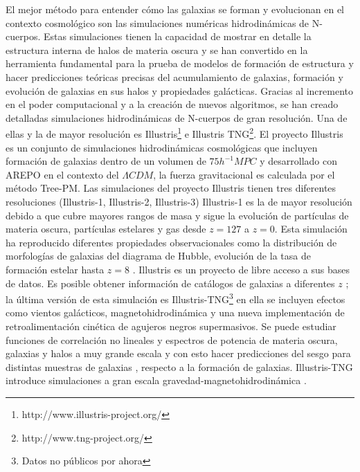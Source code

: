 \documentclass[12pt]{article}
\begin{document}
El mejor método para entender cómo las galaxias se forman y evolucionan en el 
contexto cosmológico son las simulaciones numéricas hidrodinámicas de 
N-cuerpos. Estas simulaciones tienen la capacidad de mostrar en detalle la 
estructura interna de halos de materia oscura  y se han convertido en la 
herramienta fundamental para la prueba de modelos de formación de estructura y 
hacer predicciones teóricas precisas del acumulamiento de galaxias, formación y 
evolución de galaxias en sus halos y propiedades galácticas. Gracias al 
incremento en el poder computacional y a la creación de nuevos algoritmos, se 
han creado detalladas simulaciones hidrodinámicas de N-cuerpos de gran 
resolución. Una de ellas y la de mayor resolución es 
Illustris\footnote{http://www.illustris-project.org/} e Illustris 
TNG\footnote{http://www.tng-project.org/}. El proyecto Illustris es un conjunto 
de simulaciones hidrodinámicas cosmológicas que incluyen formación de galaxias 
\cite{2014MNRAS.444.1518V} dentro de un volumen de $75h^{-1}MPC$ y desarrollado 
con AREPO \cite{2010MNRAS.401..791S} en el contexto del $\Lambda CDM$, la 
fuerza gravitacional es calculada por el método Tree-PM. Las simulaciones del 
proyecto Illustris tienen tres diferentes resoluciones (Illustris-1, 
Illustris-2, Illustris-3) Illustris-1 es la de mayor resolución debido a que 
cubre mayores rangos de masa y sigue la evolución de partículas de materia 
oscura, partículas estelares y gas desde $z=127$ a $z=0$. Esta simulación ha 
reproducido diferentes propiedades observacionales como la distribución de 
morfologías de galaxias del diagrama de Hubble, evolución de la tasa de 
formación estelar hasta $z=8$ \cite{2014MNRAS.445..175G}. Illustris es un 
proyecto de libre acceso a sus bases de datos. Es posible obtener información 
de catálogos de galaxias a diferentes $z$ \cite{2015A&C....13...12N}; la última 
versión de esta simulación es Illustris-TNG\footnote{Datos no públicos por 
ahora} en ella se incluyen efectos como vientos galácticos, 
magnetohidrodinámica y una nueva implementación de retroalimentación cinética 
de agujeros negros supermasivos. Se puede estudiar funciones de correlación no 
lineales y espectros de potencia de materia oscura, galaxias y halos a muy 
grande escala y con esto hacer predicciones del sesgo para distintas muestras 
de galaxias \cite{2018MNRAS.475..676S}, respecto a la formación de galaxias. 
Illustris-TNG introduce simulaciones a gran escala 
gravedad-magnetohidrodinámica \cite{2018MNRAS.473.4077P}.  
\end{document}
